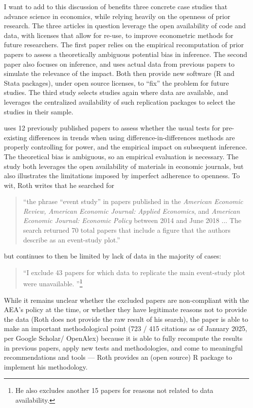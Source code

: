 \documentclass{article}
\begin{document}
I want to add to this discussion of benefits three concrete case studies that advance science in economics, while relying heavily on the openness of prior research. The three articles in question  leverage the open availability of code and data, with licenses that allow for re-use, to improve econometric methods for future researchers. The first paper relies on the empirical recomputation of prior papers to assess a theoretically ambiguous potential bias in inference. The second paper also focuses on inference, and uses actual data from previous papers to simulate the relevance of the impact. Both then provide new software (R and Stata packages), under open source licenses, to ``fix'' the problem for future studies. The third study selects studies again where data are available, and leverages the centralized availability of such replication packages to select the studies in their sample. 

\citet{roth_pretest_2022}  uses 12 previously published papers to assess whether the usual tests for pre-existing differences in trends when using difference-in-differences methods are properly controlling for power, and the empirical impact on subsequent inference. The theoretical bias is ambiguous, so an empirical evaluation is necessary. The study both leverages the open availability of materials in economic journals, but also illustrates the limitations imposed by imperfect adherence to openness. To wit, Roth writes that he searched for 
%
\begin{quote}
``the phrase “event study” in papers published in the \textit{American Economic Review, American Economic Journal: Applied Economics}, and \textit{American Economic Journal: Economic Policy} between
2014 and June 2018 ... The search returned 70 total papers that include a figure that the authors describe as an event-study plot.''
\end{quote}
%
but continues to then be limited by lack of data in the majority of cases:

\begin{quote}
    ``I exclude 43 papers for which data to replicate the main event-study plot were unavailable. \citep[pg. 307]{roth_pretest_2022}''\footnote{He also excludes another 15 papers for reasons not related to data availability.}
\end{quote}

While it remains unclear whether the excluded papers are non-compliant with the AEA's policy at the time, or whether they have legitimate reasons not to provide the data (Roth does not provide the raw result of his search), the paper is able to make an important methodological point (723 / 415 citations as of January 2025, per Google Scholar/ OpenAlex) because it is able to fully recompute the results in previous papers, apply new tests and methodologies, and come to meaningful recommendations and tools --- Roth provides an (open source) R package to implement his methodology.
\end{document}
